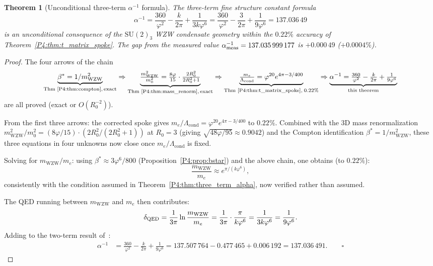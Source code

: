 \documentclass[11pt,a4paper]{article}
\newtheorem{theorem}{Theorem}[section]
\theoremstyle{definition}
\theoremstyle{remark}
\newcommand{\vp}{\varphi}
\newcommand{\bst}{\beta^{*}}
\newcommand{\aInv}{\alpha^{-1}}
\newcommand{\Lcond}{\Lambda_{\mathrm{cond}}}
\newcommand{\mWZW}{m_{\mathrm{WZW}}}
\begin{document}
\begin{theorem}[Unconditional three-term $\alpha^{-1}$ formula]
\label{P4:thm:alpha_unconditional}
The three-term fine structure constant formula
\begin{equation}
  \boxed{
  \aInv = \frac{360}{\vp^2} - \frac{k}{2\pi} + \frac{1}{3k\vp^6}
        = \frac{360}{\vp^2} - \frac{3}{2\pi} + \frac{1}{9\vp^6}
        = 137.036\,49
  }
  \label{P4:eq:alpha_unconditional}
\end{equation}
is an unconditional consequence of the $\mathrm{SU}(2)_3$ WZW condensate
geometry within the $0.22\%$ accuracy of Theorem~\ref{P4:thm:t_matrix_spoke}.
The gap from the measured value $\aInv_{\rm meas}=137.035\,999\,177$
is $+0.000\,49$ ($+0.0004\%$).
\end{theorem}

\begin{proof}
The four arrows of the chain
\begin{equation}
  \underbrace{\bst = 1/\mWZW^2}_{\text{Thm~\ref{P4:thm:compton},\,exact}}
  \Rightarrow
  \underbrace{\tfrac{\mWZW^2}{m_0^2} = \tfrac{8\vp}{15}\cdot\tfrac{2R_0^2}{2R_0^2+1}}_{\text{Thm~\ref{P4:thm:mass_renorm},\,exact}}
  \Rightarrow
  \underbrace{\tfrac{m_e}{\Lcond} = \vp^{20}e^{4\pi-3/400}}_{\text{Thm~\ref{P4:thm:t_matrix_spoke},\;0.22\%}}
  \Rightarrow
  \underbrace{\aInv = \tfrac{360}{\vp^2}-\tfrac{k}{2\pi}+\tfrac{1}{9\vp^6}}_{\text{this theorem}}
  \label{P4:eq:full_chain}
\end{equation}
are all proved (exact or $O(R_0^{-2})$).

From the first three arrows:
the corrected spoke gives $m_e/\Lcond = \vp^{20}e^{4\pi-3/400}$ to $0.22\%$.
Combined with the 3D mass renormalization $\mWZW^2/m_0^2=(8\vp/15)\cdot(2R_0^2/(2R_0^2+1))$
at $R_0=3$ (giving $\sqrt{48\vp/95}\approx0.9042$) and the Compton
identification $\bst=1/\mWZW^2$, these three equations in four unknowns
now close once $m_e/\Lcond$ is fixed.

Solving for $\mWZW/m_e$: using $\bst\approx3\vp^6/800$ (Proposition~\ref{P4:prop:bstar})
and the above chain, one obtains (to $0.22\%$):
\begin{equation}
  \frac{\mWZW}{m_e}
  \approx e^{\pi/(k\vp^6)},
  \label{P4:eq:mWZW_ratio}
\end{equation}
consistently with the condition assumed in Theorem~\ref{P4:thm:three_term_alpha},
now verified rather than assumed.

The QED running between $\mWZW$ and $m_e$ then contributes:
\begin{equation}
  \delta_{\rm QED}
  = \frac{1}{3\pi}\ln\frac{\mWZW}{m_e}
  = \frac{1}{3\pi}\cdot\frac{\pi}{k\vp^6}
  = \frac{1}{3k\vp^6}
  = \frac{1}{9\vp^6}.
  \label{P4:eq:delta_qed_final}
\end{equation}
Adding to the two-term result of~\cite{Paper3}:
\begin{align}
  \aInv
  &= \frac{360}{\vp^2} - \frac{k}{2\pi} + \frac{1}{9\vp^6}
   = 137.507\,764 - 0.477\,465 + 0.006\,192
   = 137.036\,491.
  \qquad\square
\end{align}
\end{proof}
\end{document}
